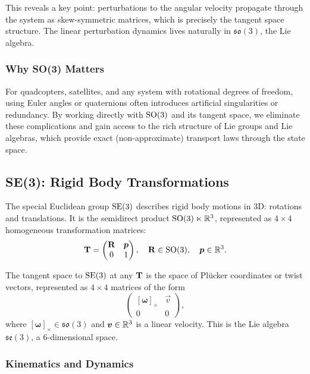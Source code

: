 This reveals a key point: perturbations to the angular velocity propagate through the system
as skew-symmetric matrices, which is precisely the tangent space structure. The linear
perturbation dynamics lives naturally in $\mathfrak{so}(3)$, the Lie algebra.

\subsubsection{Why SO(3) Matters}

For quadcopters, satellites, and any system with rotational degrees of freedom, using Euler
angles or quaternions often introduces artificial singularities or redundancy. By working
directly with $\mathrm{SO}(3)$ and its tangent space, we eliminate these complications and gain
access to the rich structure of Lie groups and Lie algebras, which provide exact (non-approximate)
transport laws through the state space.

\subsection{SE(3): Rigid Body Transformations}

The special Euclidean group $\mathrm{SE}(3)$ describes rigid body motions in 3D: rotations and
translations. It is the semidirect product $\mathrm{SO}(3) \ltimes \mathbb{R}^3$, represented as $4 \times 4$
homogeneous transformation matrices:
\begin{equation}
\mathbf{T} = \begin{pmatrix} \mathbf{R} & \bm{p} \\ 0 & 1 \end{pmatrix}, \quad \mathbf{R} \in \mathrm{SO}(3), \quad \bm{p} \in \mathbb{R}^3.
\label{eq:ch1:SE3-def}
\end{equation}

The tangent space to $\mathrm{SE}(3)$ at any $\mathbf{T}$ is the space of Plücker coordinates or
twist vectors, represented as $4 \times 4$ matrices of the form
\begin{equation}
\begin{pmatrix} [\boldsymbol{\omega}]_{\times} & \vec{v} \\ 0 & 0 \end{pmatrix},
\label{eq:ch1:se3-tangent}
\end{equation}
where $[\boldsymbol{\omega}]_{\times} \in \mathfrak{so}(3)$ and $\bm{v} \in \mathbb{R}^3$ is a linear velocity.
This is the Lie algebra $\mathfrak{se}(3)$, a 6-dimensional space.

\subsubsection{Kinematics and Dynamics}

